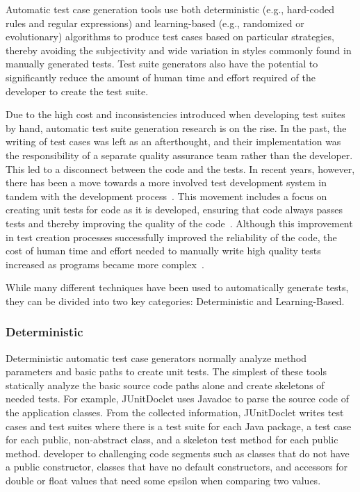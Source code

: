 Automatic test case generation tools use both deterministic (e.g., hard-coded
rules and regular expressions) and learning-based (e.g., randomized or
evolutionary) algorithms to produce test cases based on particular strategies,
thereby avoiding the subjectivity and wide variation in styles commonly found in
manually generated tests.  Test suite generators also have the potential to
significantly reduce the amount of human time and effort required of the
developer to create the test suite.  

Due to the high cost and inconsistencies introduced when developing test suites
by hand, automatic test suite generation research is on the rise.  In the past,
the writing of test cases was left as an afterthought, and their implementation
was the responsibility of a separate quality assurance team rather than the
developer.  This led to a disconnect between the code and the tests.  In recent
years, however, there has been a move towards a more involved test development
system in tandem with the development
process~\cite{Gelperin:1988:GST:62959.62965}.  This movement includes a focus on
creating unit tests for code as it is developed, ensuring that code always
passes tests and thereby improving the quality of the
code~\cite{Canfora:2006:EAT:1159733.1159788}.  Although this improvement in test
creation processes successfully improved the reliability of the code, the cost
of human time and effort needed to manually write high quality tests increased
as programs became more complex~\cite{clarke1998automated}. 

While many different techniques have been used to automatically generate tests,
they can be divided into two key categories: Deterministic and Learning-Based.

\subsubsection{Deterministic}

Deterministic automatic test case generators normally analyze method parameters
and basic paths to create unit tests.  The simplest of these tools statically
analyze the basic source code paths alone and create skeletons of  needed tests.
For example, JUnitDoclet \cite{JUnitDoclet} uses Javadoc to parse the source
code of the application classes. From the collected information, JUnitDoclet
writes test cases and test suites where there is a test suite for each Java
package, a test case for each public, non-abstract class, and a skeleton test
method for each public method. %
developer to challenging code segments such as classes that do not have a public
constructor, classes that have no default constructors, and accessors for double
or float values that need some epsilon when comparing two values.

